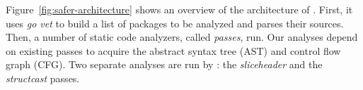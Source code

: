 



Figure~\ref{fig:safer-architecture} shows an overview of the architecture of \toolSA{}.
First, it uses \textit{go vet} to build a list of packages to be analyzed and parses their sources.
Then, a number of static code analyzers, called \textit{passes}, run.
Our analyses depend on existing passes to acquire the abstract syntax tree (AST) and control flow graph (CFG).
Two separate analyses are run by \toolSA{}: the \textit{sliceheader} and the \textit{structcast} passes. %



